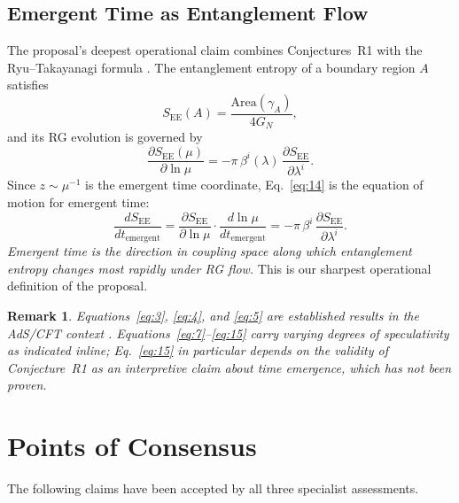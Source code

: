 \documentclass[11pt,a4paper]{article}
\newtheorem{remark}{Remark}
\begin{document}
\subsection{Emergent Time as Entanglement Flow}

The proposal's deepest operational claim combines Conjectures~R1 with the Ryu--Takayanagi formula \cite{maldacena1997,witten1998}. The entanglement entropy of a boundary region $A$ satisfies
\begin{equation}
  S_{\mathrm{EE}}(A) = \frac{\mathrm{Area}(\gamma_A)}{4G_N},
  \label{eq:13}
\end{equation}
and its RG evolution is governed by
\begin{equation}
  \frac{\partial S_{\mathrm{EE}}(\mu)}{\partial\ln\mu}
  = -\pi\,\beta^{i}(\lambda)\,\frac{\partial S_{\mathrm{EE}}}{\partial\lambda^{i}}.
  \label{eq:14}
\end{equation}
Since $z \sim \mu^{-1}$ is the emergent time coordinate, Eq.~\eqref{eq:14} is the equation of motion for emergent time:
\begin{equation}
  \boxed{
  \frac{dS_{\mathrm{EE}}}{dt_{\mathrm{emergent}}}
  = \frac{\partial S_{\mathrm{EE}}}{\partial\ln\mu}
    \cdot\frac{d\ln\mu}{dt_{\mathrm{emergent}}}
  = -\pi\,\beta^{i}\,\frac{\partial S_{\mathrm{EE}}}{\partial\lambda^{i}}.
  }
  \label{eq:15}
\end{equation}
\emph{Emergent time is the direction in coupling space along which entanglement entropy changes most rapidly under RG flow.} This is our sharpest operational definition of the proposal.

\begin{remark}
Equations~\eqref{eq:3}, \eqref{eq:4}, and \eqref{eq:5} are established results in the AdS/CFT context \cite{skenderis2002,witten1998,maldacena1997}. Equations~\eqref{eq:7}--\eqref{eq:15} carry varying degrees of speculativity as indicated inline; Eq.~\eqref{eq:15} in particular depends on the validity of Conjecture~R1 as an interpretive claim about time emergence, which has not been proven.
\end{remark}

\section{Points of Consensus}

The following claims have been accepted by all three specialist assessments.
\end{document}
